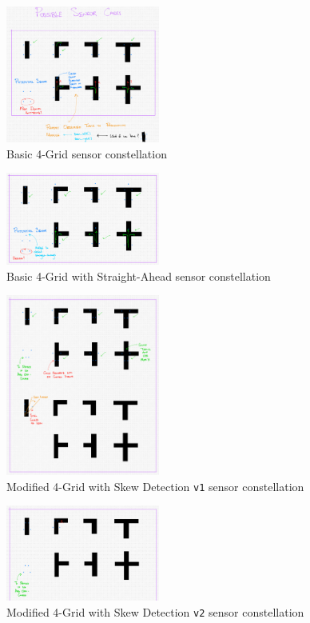 \documentclass[conference]{IEEEtran}
\begin{document}
\begin{figure}[H]
	\centerline{\includegraphics[width=0.45\textwidth]{constellation-basic-4-grid.png}}
	\caption{Basic 4-Grid sensor constellation}
	\label{fig:constellation-basic-4-grid}
\end{figure}
\begin{figure}[H]
	\centerline{\includegraphics[width=0.45\textwidth]{constellation-basic-4-straight.png}}
	\caption{Basic 4-Grid with Straight-Ahead sensor constellation}
	\label{fig:constellation-basic-4-straight}
\end{figure}
\begin{figure}[H]
	\centerline{\includegraphics[width=0.45\textwidth]{constellation-4-skew-v1.png}}
	\caption{Modified 4-Grid with Skew Detection \texttt{v1} sensor constellation}
	\label{fig:constellation-4-skew-v1}
\end{figure}
\begin{figure}[H]
	\centerline{\includegraphics[width=0.45\textwidth]{constellation-4-skew-v2.png}}
	\caption{Modified 4-Grid with Skew Detection \texttt{v2} sensor constellation}
	\label{fig:constellation-4-skew-v2}
\end{figure}
\end{document}

